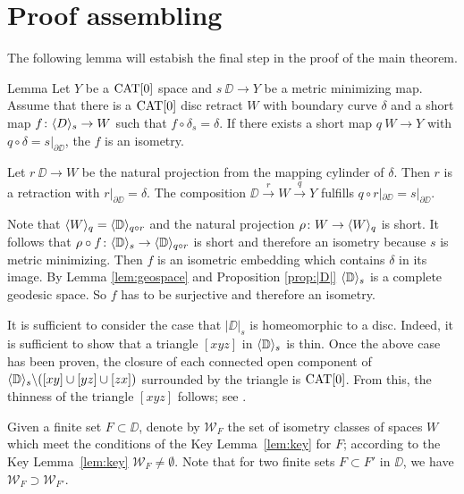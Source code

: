 \section{Proof assembling}\label{Main theorem}

The following lemma will estabish the final step in the proof of the main theorem.

\begin{thm}{Lemma}\label{lem:maj is isom}
Let $Y$ be a $\mathop{\rm CAT}\nolimits[0]$ space and $s\:\DD\to Y$ be a metric minimizing map.
Assume that there is a $\mathop{\rm CAT}\nolimits[0]$ disc retract $W$ with boundary curve $\delta$ and a short map $f\colon\langle D\rangle_s \to W$
such that $f\circ \delta_s=\delta$. If there exists a short map 
$q\: W\to Y$ with $q\circ \delta=s|_{\partial \DD}$, the $f$ is an isometry.
\end{thm}

Let $r\:\DD\to W$ be the natural projection from the mapping cylinder of $\delta$. Then $r$ 
is a retraction with $r|_{\partial \DD}=\delta$.
The composition $\DD\xrightarrow{r}W\xrightarrow{q} Y$ fulfills $q\circ r|_{\partial \DD}=s|_{\partial \DD}$.

Note that  $\langle W\rangle_q=\langle\mathbb{D}\rangle_{q\circ r}$ and the natural projection $\rho\colon W\to \langle W\rangle_q$ is short.
It follows that $\rho\circ f\colon \langle\mathbb{D}\rangle_s\to \langle\mathbb{D}\rangle_{q\circ r}$ is short and therefore an isometry
because $s$ is metric minimizing. Then $f$ is an isometric embedding which contains $\delta$
in its image. By Lemma \ref{lem:geospace} and Proposition \ref{prop:|D|} $\langle\mathbb{D}\rangle_s$ is a complete geodesic space.
So $f$ has to be surjective and therefore an isometry.
\qeds

It is sufficient to consider
the case that $|\DD|_s$ is  homeomorphic to a disc.
Indeed, it is sufficient to show that a triangle $[xyz]$ in $\langle\mathbb{D}\rangle_s$ is thin. 
Once the above case has been proven, the closure of each connected open component of $\langle\mathbb{D}\rangle_s\backslash ([xy]\cup[yz]\cup[zx])$
surrounded by the triangle is $\mathop{\rm CAT}\nolimits[0]$.
From this, the thinness of the triangle $[xyz]$ follows; see \cite{bishop}.


Given a finite set $F\subset \DD$,
denote by $\mathcal{W}_F$
the set of isometry classes of spaces $W$ which meet the conditions of the Key Lemma~\ref{lem:key}
for $F$;
according to the Key Lemma~\ref{lem:key} $\mathcal{W}_F\ne\emptyset$.
Note that for two finite sets $F\subset F'$ in $\DD$,
we have $\mathcal{W}_F\supset \mathcal{W}_{F'}$.

